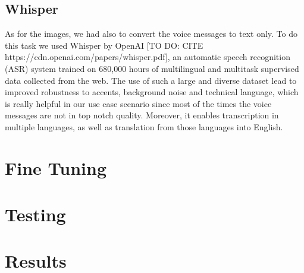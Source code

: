 \documentclass[10pt,twocolumn,letterpaper]{article}
\begin{document}
\subsection{Whisper}

As for the images, we had also to convert the voice messages to text only. To do this task we used Whisper by OpenAI [TO DO: CITE https://cdn.openai.com/papers/whisper.pdf], an automatic speech recognition (ASR) system trained on 680,000 hours of multilingual and multitask supervised data collected from the web. The use of such a large and diverse dataset lead to improved robustness to accents, background noise and technical language, which is really helpful in our use case scenario since most of the times the voice messages are not in top notch quality. Moreover, it enables transcription in multiple languages, as well as translation from those languages into English.

\section{Fine Tuning}

\section{Testing}

\section{Results}





{\small


}
\end{document}

